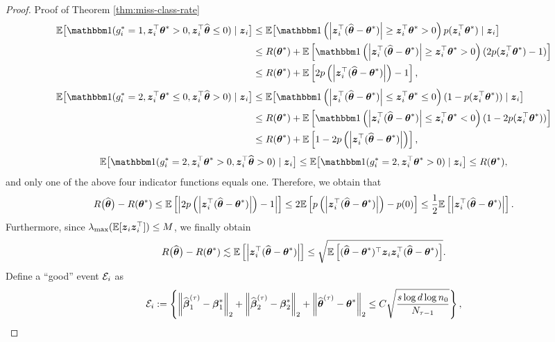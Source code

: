 \begin{proof}{Proof of Theorem \ref{thm:miss-class-rate}}
\begin{align*}
	\EE\big[\bbone(g_i^* =1, \bz_i^{\top}\btheta^*>0, \bz_i^{\top}\hat{\btheta} \leq 0) \cond \bz_i\big] & \leq \EE\big[\bbone\left(\abs{\bz_i^{\top}(\hat\btheta-\btheta^*)}\geq \bz_i^{\top}\btheta^*>0\right)p(\bz_i^{\top}\btheta^*) \cond \bz_i\big] \\
	&\leq R(\btheta^*) + \EE\brackets{\bbone\left(\abs{\bz_i^{\top}(\hat\btheta-\btheta^*)}\geq \bz_i^{\top}\btheta^*>0\right)(2p(\bz_i^{\top}\btheta^*)-1)}\\
	&\leq R(\btheta^*) + \EE\brackets{2p\paren{\abs{\bz_i^{\top}(\hat\btheta-\btheta^*)}}-1},
\end{align*}
\begin{align*}
	\EE\big[\bbone(g_i^* =2, \bz_i^{\top}\btheta^*\leq0, \bz_i^{\top}\hat{\btheta} > 0) \cond \bz_i\big] &\leq \EE\big[\bbone\left(\abs{\bz_i^{\top}(\hat\btheta-\btheta^*)} \leq\bz_i^{\top}\btheta^*\leq0\right)(1-p(\bz_i^{\top}\btheta^*)) \cond \bz_i\big]\\
	&\leq R(\btheta^*) + \EE\brackets{\bbone\left(\abs{\bz_i^{\top}(\hat\btheta-\btheta^*)}\leq \bz_i^{\top}\btheta^*<0\right)(1-2p(\bz_i^{\top}\btheta^*))}\\
	&\leq R(\btheta^*) + \EE\brackets{1-2p\paren{\abs{\bz_i^{\top}(\hat\btheta-\btheta^*)}}},
\end{align*}
\[\EE\big[\bbone(g_i^* =2, \bz_i^{\top}\btheta^*>0, \bz_i^{\top}\hat{\btheta} > 0) \cond \bz_i\big] \leq \EE\big[\bbone(g_i^* =2, \bz_i^{\top}\btheta^*>0) \cond \bz_i\big] \leq R(\btheta^*),\]
and only one of the above four indicator functions equals one. Therefore, we obtain that
\[R\big(\widehat{\boldsymbol{\theta}}\big)-R(\boldsymbol{\theta}^*) \leq \mathbb{E}\left[ \left\lvert2p\left(\left\lvert\boldsymbol{z}_i^{\top}(\widehat{\boldsymbol{\theta}}-\boldsymbol{\theta}^*)\right\rvert\right)-1\right\rvert \right] \leq 2\mathbb{E}\left[ p\left(\left\lvert\boldsymbol{z}_i^{\top}(\widehat{\boldsymbol{\theta}}-\boldsymbol{\theta}^*)\right\rvert\right)-p(0) \right] \leq \frac{1}{2}\mathbb{E}\left[ \left\lvert\boldsymbol{z}_i^{\top}(\widehat{\boldsymbol{\theta}}-\boldsymbol{\theta}^*)\right\rvert \right].\]
Furthermore, since $\lambda_{\max}(\mathbb{E}[\boldsymbol{z}_i\boldsymbol{z}_i^{\top}]) \leq M$, we finally obtain
\[R\big(\widehat{\boldsymbol{\theta}}\big)-R(\boldsymbol{\theta}^*) \lesssim \mathbb{E}\left[ \left\lvert\boldsymbol{z}_i^{\top}(\widehat{\boldsymbol{\theta}}-\boldsymbol{\theta}^*)\right\rvert \right] \leq \sqrt{\mathbb{E}\left[ (\widehat{\boldsymbol{\theta}}-\boldsymbol{\theta}^*)^{\top}\boldsymbol{z}_i\boldsymbol{z}_i^{\top}(\widehat{\boldsymbol{\theta}}-\boldsymbol{\theta}^*) \right]}.\]
Define a ``good'' event ${\cal E}_i$ as
\begin{equation*}
	{\cal E}_i := \left\{ \left\lVert\widehat{\boldsymbol{\beta}}_{1}^{(\tau)} - \boldsymbol{\beta}_{1}^*\right\rVert_{2} + \left\lVert\widehat{\boldsymbol{\beta}}_{2}^{(\tau)} - \boldsymbol{\beta}_{2}^*\right\rVert_{2}  + \left\lVert\widehat{\boldsymbol{\theta}}^{(\tau)} - \boldsymbol{\theta}^*\right\rVert_{2}
	\leq C	\sqrt{\frac{s\log d \log n_0}{N_{\tau-1}}}\right\},
\end{equation*}

\end{proof}
